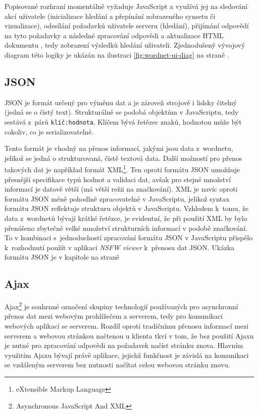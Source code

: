 \documentclass[a4paper, 11pt, oneside, showtrims]{book}
\newcommand{\simplywn}{\textit{NSFW viewer} }
\newcommand{\itNameRef}[1]{\textit{\nameref{#1}}}
\begin{document}
				Popisované rozhraní momentálně vyžaduje JavaScript a využívá jej na sledování akcí uživatele (inicializace hledání a přepínání zobrazeného synsetu či vizualizace), odesílání požadavků uživatele serveru (hledání), přijímání odpovědí na tyto požadavky a následné zpracování odpovědi a aktualizace HTML dokumentu%
				, tedy zobrazení výsledků hledání uživateli. %
				Zjednodušený vývojový diagram této logiky je ukázán na ilustraci \ref{fig:wordnet-ui-diag} na straně \pageref{fig:wordnet-ui-diag}.

				\subsection{JSON}
				\label{cha:json}

					JSON je formát určený pro výměnu dat a je zároveň strojově i lidsky čitelný (jedná se o čistý text). Strukturálně se podobá objektům v JavaScriptu, tedy sestává z~párů \texttt{klíč:hodnota}. Klíčem bývá řetězec znaků, hodnotou může být cokoliv, co je serializovatelné. \parencite{jsonDoc}

					Tento formát je vhodný na přenos informací, jakými jsou data z~wordnetu, jelikož se jedná o strukturovaná, čistě textová data. Další možností pro přenos takových dat je například formát XML\footnote{eXtensible Markup Language}. Ten oproti formátu JSON umožňuje přesnější specifikace typů hodnot a validaci dat, avšak pro stejné množství informací je datově větší (má větší režii na značkování). XML je navíc oproti formátu JSON méně pohodlně zpracovatelné v JavaScriptu, jelikož syntax formátu JSON reflektuje strukturu objektů v JavaScriptu. Vzhledem k~tomu, že data z~wordnetů bývají krátké řetězce, je evidentní, že při použití XML by bylo přenášeno zbytečně velké množství strukturních informací v podobě značkování. \parencite{jsonVsXML} To v kombinaci s~jednoduchostí zpracování formátu JSON v JavaScriptu přispělo k~rozhodnutí použít v aplikaci \simplywn k~přenosu dat JSON. Ukázka formátu JSON je v kapitole \itNameRef{cha:answerStruct} na straně \pageref{cha:answerStruct}

				\subsection{Ajax}

					Ajax\footnote{Asynchronous JavaScript And XML} je souhrnné označení skupiny technologií používaných pro asynchronní přenos dat mezi webovým prohlížečem a serverem, tedy pro komunikaci webových aplikací se serverem. Rozdíl oproti tradičnímu přenosu informací mezi serverem a webovou stránkou načtenou u klienta tkví v tom, že bez použití Ajaxu je nutné pro zpracování odpovědi na požadavek načíst stránku znova. Hlavním využitím Ajaxu bývají právě aplikace, jejichž funkčnost je závislá na komunikaci se vzdáleným serverem bez nutnosti načítat celou webovou stránku znovu. \parencite{garrett2005ajax}
\end{document}
